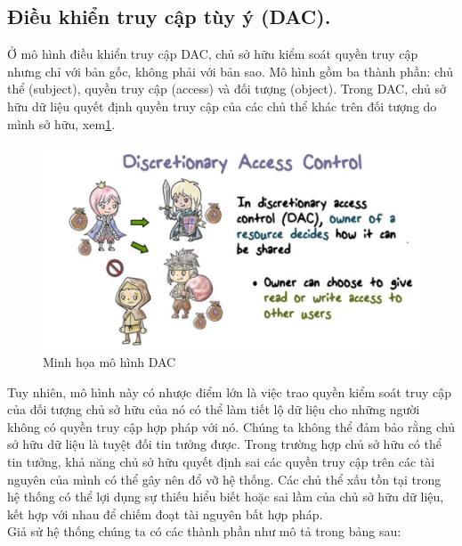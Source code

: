 \subsection{Điều khiển truy cập tùy ý (DAC).}
Ở mô hình điều khiển truy cập DAC, chủ sở hữu kiểm soát quyền truy cập nhưng
chỉ với bản gốc, không phải với bản sao. Mô hình gồm ba thành phần: chủ thể (subject),
quyền truy cập (access) và đối tượng (object). Trong DAC, chủ sở hữu dữ liệu quyết
định quyền truy cập của các chủ thể khác trên đối tượng do mình sở hữu, xem\ref{fig:chap2-dac}. 
\begin{figure}
    \centering
    \includegraphics[scale=0.5]{graphics/chapter-2/chap2-dac.png}
    \caption{Minh họa mô hình DAC}
    \label{fig:chap2-dac}
\end{figure}
\indent Tuy nhiên, mô hình này có nhược điểm lớn là việc trao quyền kiểm soát truy cập
của đối tượng chủ sở hữu của nó có thể làm tiết lộ dữ liệu cho những người không có
quyền truy cập hợp pháp với nó. Chúng ta không thể đảm bảo rằng chủ sở hữu dữ liệu
là tuyệt đối tin tưởng được. Trong trường hợp chủ sở hữu có thể tin tưởng, khả năng chủ
sở hữu quyết định sai các quyền truy cập trên các tài nguyên của mình có thể gây nên đổ
vỡ hệ thống. Các chủ thể xấu tồn tại trong hệ thống có thể lợi dụng sự thiếu hiểu biết hoặc sai lầm của chủ sở hữu dữ liệu, kết hợp với nhau để chiếm đoạt tài nguyên bất hợp
pháp. \\
Giả sử hệ thống chúng ta có các thành phần như mô tả trong bảng sau: \\

